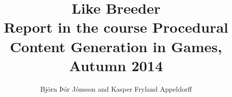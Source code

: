 \documentclass[]{article}
\title{Like Breeder\\ \small Report in the course Procedural Content Generation in Games, Autumn 2014}
\author{Björn Þór Jónsson and Kasper Fryland Appeldorff}
\begin{document}
\maketitle

\begin{abstract}

\end{abstract}

\section{}
\end{document}

